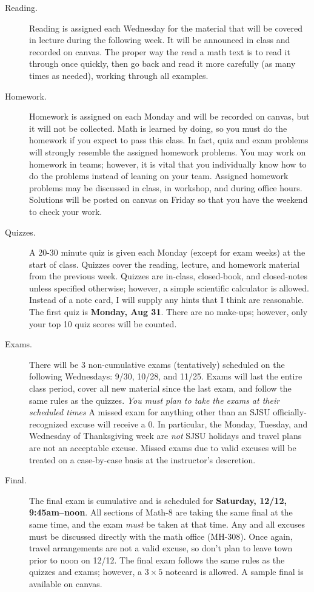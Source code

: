 \documentclass[letterpaper, 12pt]{article}
\begin{document}
\begin{description}
\item[Reading.] Reading is assigned each Wednesday for the material that will
  be covered in lecture during the following week.  It will be announced in
  class and recorded on canvas.  The proper way the read a math text is to read
  it through once quickly, then go back and read it more carefully (as many
  times as needed), working through all examples.

\item[Homework.] Homework is assigned on each Monday and will be recorded on
  canvas, but it will not be collected.  Math is learned by doing, so you must
  do the homework if you expect to pass this class.  In fact, quiz and exam
  problems will strongly resemble the assigned homework problems.  You may work
  on homework in teams; however, it is vital that you individually know how to
  do the problems instead of leaning on your team.  Assigned homework problems
  may be discussed in class, in workshop, and during office hours.  Solutions
  will be posted on canvas on Friday so that you have the weekend to check your
  work.

\item[Quizzes.] A 20-30 minute quiz is given each Monday (except for exam
  weeks) at the start of class.  Quizzes cover the reading, lecture, and
  homework material from the previous week.  Quizzes are in-class, closed-book,
  and closed-notes unless specified otherwise; however, a simple scientific
  calculator is allowed.  Instead of a note card, I will supply any hints that
  I think are reasonable.  The first quiz is \textbf{Monday, Aug 31}.  There
  are no make-ups; however, only your top 10 quiz scores will be counted.

\item[Exams.] There will be 3 non-cumulative exams (tentatively) scheduled on
  the following Wednesdays: 9/30, 10/28, and 11/25.  Exams will last the entire
  class period, cover all new material since the last exam,  and follow the
  same rules as the quizzes.  \emph{You must plan to take the exams at their
  scheduled times}  A missed exam for anything other than an SJSU
  officially-recognized excuse will receive a 0.  In particular, the Monday,
  Tuesday, and Wednesday of Thanksgiving week are \emph{not} SJSU holidays and
  travel plans are not an acceptable excuse.  Missed exams due to valid excuses
  will be treated on a case-by-case basis at the instructor's descretion.

\item[Final.] The final exam is cumulative and is scheduled for
  \textbf{Saturday, 12/12, 9:45am--noon}.  All sections of Math-8 are taking the
  same final at the same time, and the exam \emph{must} be taken at that time.
  Any and all excuses must be discussed directly with the math office (MH-308).
  Once again, travel arrangements are not a valid excuse, so don't plan to leave
  town prior to noon on 12/12.  The final exam follows the same rules as the
  quizzes and exams; however, a $3\times 5$ notecard is allowed.  A sample
  final is available on canvas.


\end{description}
\end{document}
